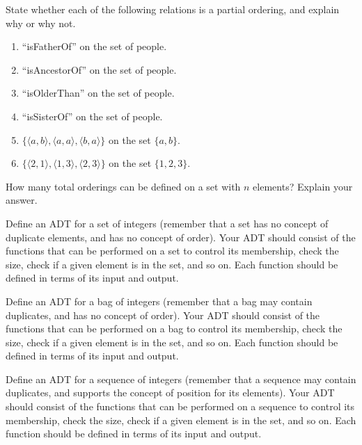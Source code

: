 \begin{exercises}
\item
State whether each of the following relations is a partial ordering,
and explain why or why not.
\begin{enumerate}
\item ``isFatherOf'' on the set of people.
\item ``isAncestorOf'' on the set of people.
\item ``isOlderThan'' on the set of people.
\item ``isSisterOf'' on the set of people.
\item \(\{\langle a, b\rangle, \langle a, a\rangle, \langle b,
a\rangle\}\) on the set \(\{a, b\}\).
\item \(\{\langle 2, 1\rangle, \langle 1, 3\rangle, \langle 2,
3\rangle\}\) on the set \(\{1, 2, 3\}\).
\end{enumerate}

\item
How many total orderings can be defined on a set with \(n\) elements?
Explain your answer.

\item
Define an ADT for a set of integers (remember that a set has no
concept of duplicate elements, and has no concept of
order).
Your ADT should consist of the functions that can be performed on
a set to control its membership, check the size, check if a given
element is in the set, and so on.
Each function should be defined in terms of its input and output.

\item
Define an ADT for a bag of integers (remember that a bag may
contain duplicates, and has no concept of
order).
Your ADT should consist of the functions that can be performed on
a bag to control its membership, check the size, check if a given
element is in the set, and so on.
Each function should be defined in terms of its input and output.

\item
Define an ADT for a sequence of integers (remember that a sequence may 
contain duplicates, and supports the concept of
position for its elements).
Your ADT should consist of the functions that can be performed on
a sequence to control its membership, check the size, check if a given
element is in the set, and so on.
Each function should be defined in terms of its input and output.


\end{exercises}
